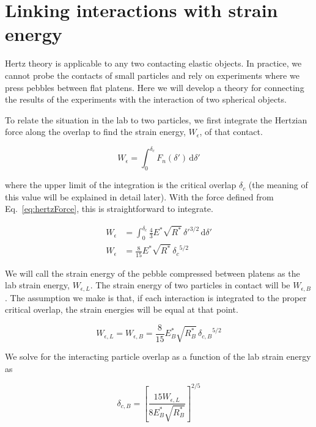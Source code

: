 \section{Linking interactions with strain energy}\label{theoryStrainEnergy}
Hertz theory is applicable to any two contacting elastic objects. In practice, we cannot probe the contacts of small particles and rely on experiments where we press pebbles between flat platens. Here we will develop a theory for connecting the results of the experiments with the interaction of two spherical objects.

To relate the situation in the lab to two particles, we first integrate the Hertzian force along the overlap to find the strain energy, $W_\epsilon$, of that contact. 

\begin{equation}
	W_\epsilon = \int_0^{\delta_c}\!F_n(\delta')\,\mathrm{d}\delta'
\end{equation}

where the upper limit of the integration is the critical overlap $\delta_c$ (the meaning of this value will be explained in detail later). With the force defined from Eq.~\ref{eq:hertzForce}, this is straightforward to integrate.

\begin{align}
	W_\epsilon& = \int_0^{\delta_c}\!  \frac{4}{3}E^*\sqrt{R^*}\,\delta'^{3/2} \,\mathrm{d}\delta' \\
	W_\epsilon & = \frac{8}{15}E^*\sqrt{R^*}\, {\delta_c}^{5/2}
\end{align}

We will call the strain energy of the pebble compressed between platens as the lab strain energy, $W_{\epsilon,L}$. The strain energy of two particles in contact will be $W_{\epsilon,B}$. The assumption we make is that, if each interaction is integrated to the proper critical overlap, the strain energies will be equal at that point.

\begin{equation}
	W_{\epsilon,L} = W_{\epsilon,B} = \frac{8}{15}E_B^*\sqrt{R_B^*}\, {\delta_{c,B}}^{5/2}
\end{equation}

We solve for the interacting particle overlap as a function of the lab strain energy as

\begin{equation}
	\delta_{c,B} = \left[\frac{15W_{\epsilon,L}}{8E_B^*\sqrt{R_B^*}}\right]^{2/5}
\end{equation}


